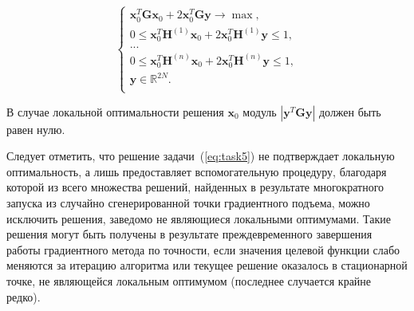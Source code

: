 \begin{equation}
    \begin{cases}
       \textbf{x}_0^T\textbf{G}\textbf{x}_0 + 2\textbf{x}_0^T\textbf{G}\textbf{y} \rightarrow \max,\\
       0 \leq \textbf{x}_0^T\textbf{H}^{(1)}\textbf{x}_0 + 2\textbf{x}_0^T\textbf{H}^{(1)}\textbf{y} \leq 1,\\
       ...\\
       0 \leq \textbf{x}_0^T\textbf{H}^{(n)}\textbf{x}_0 + 2\textbf{x}_0^T\textbf{H}^{(n)}\textbf{y} \leq 1,\\
      \textbf{y} \in \mathbb{R}^{2N}.\\
     \end{cases}
     \label{eq:task5}
\end{equation}

В случае локальной оптимальности решения $\textbf{x}_0$ модуль $|\textbf{y}^T\textbf{G}\textbf{y}|$ должен быть равен нулю.

Следует отметить, что решение задачи~(\ref{eq:task5}) не подтверждает локальную оптимальность, а лишь предоставляет вспомогательную процедуру, благодаря которой из всего множества решений, найденных в результате многократного запуска из случайно сгенерированной точки
градиентного подъема, можно исключить решения, заведомо не являющиеся локальными оптимумами. Такие решения могут быть получены в результате преждевременного завершения работы градиентного метода по точности, если значения целевой функции слабо меняются за итерацию алгоритма или текущее решение оказалось в стационарной точке, не являющейся локальным оптимумом (последнее случается крайне редко).
